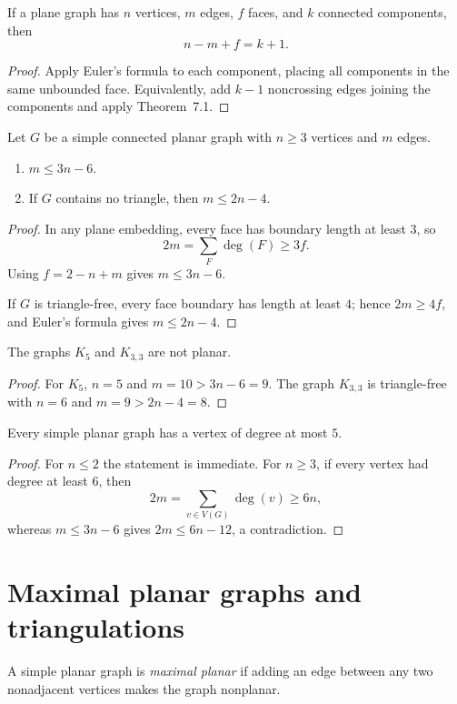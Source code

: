 \begin{notecorollary}
If a plane graph has $n$ vertices, $m$ edges, $f$ faces, and $k$ connected
components, then
\[
  n-m+f=k+1.
\]
\end{notecorollary}
\begin{proof}
Apply Euler's formula to each component, placing all components in the same
unbounded face.  Equivalently, add $k-1$ noncrossing edges joining the
components and apply Theorem~7.1.
\end{proof}
\begin{notecorollary}
Let $G$ be a simple connected planar graph with $n\ge3$ vertices and $m$
edges.
\begin{enumerate}
  \item $m\le3n-6$.
  \item If $G$ contains no triangle, then $m\le2n-4$.
\end{enumerate}
\end{notecorollary}
\begin{proof}
In any plane embedding, every face has boundary length at least $3$, so
\[
  2m=\sum_F\deg(F)\ge3f.
\]
Using $f=2-n+m$ gives $m\le3n-6$.

If $G$ is triangle-free, every face boundary has length at least $4$; hence
$2m\ge4f$, and Euler's formula gives $m\le2n-4$.
\end{proof}

\begin{notecorollary}
The graphs $K_5$ and $K_{3,3}$ are not planar.
\end{notecorollary}
\begin{proof}
For $K_5$, $n=5$ and $m=10>3n-6=9$.  The graph $K_{3,3}$ is triangle-free
with $n=6$ and $m=9>2n-4=8$.
\end{proof}

\begin{notecorollary}
Every simple planar graph has a vertex of degree at most $5$.
\end{notecorollary}
\begin{proof}
For $n\le2$ the statement is immediate.  For $n\ge3$, if every vertex had
degree at least $6$, then
\[
  2m=\sum_{v\in V(G)}\deg(v)\ge6n,
\]
whereas $m\le3n-6$ gives $2m\le6n-12$, a contradiction.
\end{proof}
\section{Maximal planar graphs and triangulations}

\begin{notedefinition}
A simple planar graph is \emph{maximal planar} if adding an edge between any
two nonadjacent vertices makes the graph nonplanar.
\end{notedefinition}


